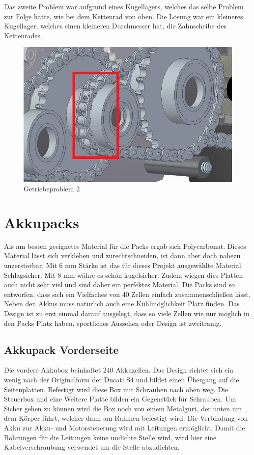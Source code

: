 Das zweite Problem war aufgrund eines Kugellagers, welches das selbe Problem zur Folge hätte, wie bei dem Kettenrad von oben. Die Lösung war ein kleineres Kugellager, welches einen kleineren Durchmesser hat, die Zahnscheibe des Kettenrades.

\begin{figure} [H]
	\begin{center}
		\includegraphics[scale=0.5]{figures/mechanik/Getriebeproblem1.jpg}
			\caption{Getriebeproblem 2}
			\label{fig:Getriebeproblem 2}
	\end{center}
\end{figure}

\newpage

\section{Akkupacks}
Als am besten geeignetes Material für die Packs ergab sich Polycarbonat. Dieses Material lässt sich verkleben und zurechtschneiden, ist dann aber doch nahezu unzerstörbar. Mit 6 mm Stärke ist das für dieses Projekt ausgewählte Material Schlagsicher. Mit 8 mm währe es schon kugelsicher. Zudem wiegen dies Platten auch nicht sehr viel und sind daher ein perfektes Material.
Die Packs sind so entworfen, dass sich ein Vielfaches von 40 Zellen einfach zusammenschließen lässt. Neben den Akkus muss natürlich auch eine Kühlmöglichkeit Platz finden. Das Design ist zu erst einmal darauf ausgelegt, dass so viele Zellen wie nur möglich in den Packs Platz haben, sportliches Aussehen oder Design ist zweitranig.

\subsection{Akkupack Vorderseite}
Die vordere Akkubox beinhaltet 240 Akkuzellen. Das Design richtet sich ein wenig nach der Originalform der Ducati S4 und bildet einen Übergang auf die Seitenplatten. Befestigt wird diese Box mit Schrauben nach oben weg. Die Steuerbox und eine Weitere Platte bilden ein Gegenstück für Schrauben. Um Sicher gehen zu können wird die Box noch von einem Metalgurt, der unten um dem Körper führt, welcher dann am Rahmen befestigt wird. Die Verbindung von Akku zur Akku- und Motorsteuerung wird mit Leitungen ermöglicht. Damit die Bohrungen für die Leitungen keine undichte Stelle wird, wird hier eine Kabelverschraubung verwendet um die Stelle abzudichten.


